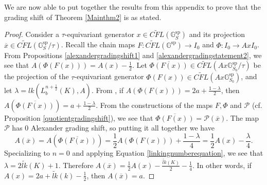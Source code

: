 \documentclass[11pt]{amsart}
\theoremstyle{definition}
\theoremstyle{remark}
\numberwithin{equation}{section}
\begin{document}
 
We are now able to put together the results from this appendix to prove that the grading shift of Theorem \ref{Mainthm2} is as stated.
\begin{proof}
Consider a $\tau$-equivariant generator $x\in \widetilde{CFL}(\mathbb{G}_S^{\textrm{sp}})$ and its projection $\overline{x}\in \widetilde{CFL}(\mathbb{G}_S^{\textrm{sp}}/\tau)$.
Recall the chain maps $F:\widetilde{CFL}(\mathbb{G}^{\textrm{sp}})\to I_0$  and $\Phi:I_0\to AxI_0$. From Propositions \ref{alexandergradingshift1} and \ref{alexandergradingstatement2}, we see that $A(\Phi(F(x)))=A(x)-\frac{1}{2}$. Let $\overline{\Phi(F(x))}\in \widetilde{CFL}(Ax\mathbb{G}_{S_0}^{\textrm{sp}}/\tau)$ be the projection of the $\tau$-equivariant generator $\Phi(F(x))\in \widetilde{CFL}(Ax\mathbb{G}_{S_0}^{\textrm{sp}})$, and let $\lambda=lk(L^{n+\frac{1}{2}}_b(K),A)$. From \cite[~Theorem 1.3]{HendricksDP}, if $A(\Phi(F(x)))=2a+\frac{1-\lambda}{2}$, then $A(\overline{\Phi(F(x))})=a+\frac{1-
\lambda}{2}$. From the constructions of the maps $F,\Phi$ and $\mathcal{P}$ (cf. Proposition \ref{quotientgradingshift}), we see that $\overline{\Phi(F(x))}=\mathcal{P}(\overline{x})$. The map $\mathcal{P}$ has $0$ Alexander grading shift, so putting it all together we have \[A(\overline{x})=A(\overline{\Phi(F(x))})=\frac{1}{2}A(\Phi(F(x)))+\frac{1-\lambda}{4}=\frac{1}{2}A(x)-\frac{\lambda}{4}.\]Specializing to $n=0$ and applying Equation \ref{linkingnumberequation}, we see that $\lambda=2\widetilde{lk}(K)+1$. Therefore $A(\overline{x})=\frac{1}{2}A(x)-\frac{\widetilde{lk}(K)}{2}-\frac{1}{4}$. In other words, if $A(x)=2a+\widetilde{lk}(k)-\frac{1}{2}$, then $A(\overline{x})=a$.
	

\end{proof}
\end{document}
